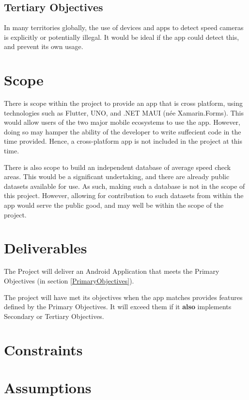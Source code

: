 \documentclass[11pt, a4paper, notitlepage]{report}
\begin{document}
\subsection{Tertiary Objectives}
In many territories globally, the use of devices and apps to detect speed 
cameras is explicitly or potentially illegal. It would be ideal 
if the app could detect this, and prevent its own usage.

\section{Scope}
There is scope within the project to provide an app that is cross 
platform, using technologies such as Flutter, UNO, and .NET MAUI (née 
Xamarin.Forms). 
This would allow users of the two major mobile ecosystems to use the app. 
However, doing so may hamper the ability of the developer to write suffecient 
code in the time provided.
Hence, a cross-platform app is not included in the project at this time.

There is also scope to build an independent database of average speed check 
areas. 
This would be a significant undertaking, and there are already public datasets 
available for use. As such, making such a database is not 
in the scope of this project.
However, allowing for contribution to such datasets from within the app would 
serve the public good, and may well be within the scope of the project.

\section{Deliverables}
The Project will deliver an Android Application that meets the Primary 
Objectives (in section \ref{PrimaryObjectives}).

The project will have met its objectives when the app matches provides 
features defined by the Primary Objectives. It will exceed them if it 
\textbf{also} implements Secondary or Tertiary Objectives.

\section{Constraints}

\section{Assumptions}
\end{document}
